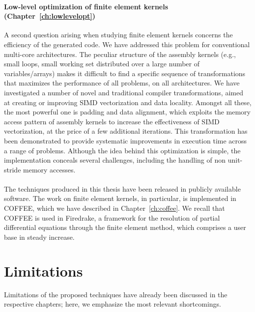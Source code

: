 \paragraph{Low-level optimization of finite element kernels (Chapter~\ref{ch:lowlevelopt})}
A second question arising when studying finite element kernels concerns the efficiency of the generated code. We have addressed this problem for conventional multi-core architectures. The peculiar structure of the assembly kernels (e.g., small loops, small working set distributed over a large number of variables/arrays) makes it difficult to find a specific sequence of transformations that maximizes the performance of all problems, on all architectures. We have investigated a number of novel and traditional compiler transformations, aimed at creating or improving SIMD vectorization and data locality. Amongst all these, the most powerful one is padding and data alignment, which exploits the memory access pattern of assembly kernels to increase the effectiveness of SIMD vectorization, at the price of a few additional iterations. This transformation has been demonstrated to provide systematic improvements in execution time across a range of problems. Although the idea behind this optimization is simple, the implementation conceals several challenges, including the handling of non unit-stride memory accesses.
~\\ 
~\\
The techniques produced in this thesis have been released in publicly available software. The work on finite element kernels, in particular, is implemented in COFFEE, which we have described in Chapter~\ref{ch:coffee}. We recall that COFFEE is used in Firedrake, a framework for the resolution of partial differential equations through the finite element method, which comprises a user base in steady increase.

\section{Limitations}
Limitations of the proposed techniques have already been discussed in the respective chapters; here, we emphasize the most relevant shortcomings.
 
